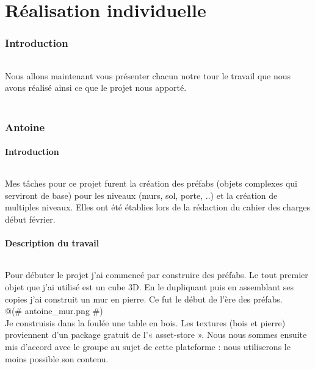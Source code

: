 \documentclass[titlepage, 13px, a4paper]{report}
\begin{document}

\newpage


\part{Réalisation individuelle}
\section*{Introduction}
\paragraph{} \hspace{0pt}
Nous allons maintenant vous présenter chacun notre tour le travail que nous avons réalisé 
ainsi ce que le projet nous apporté. \\ \\

\section{Antoine}
\subsection{Introduction}
\paragraph{} \hspace{0pt} 
Mes tâches pour ce projet furent la création des préfabs (objets complexes qui
serviront de base) pour les niveaux (murs, sol, porte, ..) et la création de multiples
niveaux. Elles ont été établies lors de la rédaction du cahier des charges début février. \\

\subsection{Description du travail}

\paragraph{} \hspace{0pt} 
Pour débuter le projet j'ai commencé par construire des préfabs. Le tout premier
objet que j'ai utilisé est un cube 3D. En le dupliquant puis en assemblant ses
copies j'ai construit un mur en pierre. Ce fut le début de l'ère des préfabs. \\@(\# antoine\_mur.png \#)\@  \\
Je construisis dans la foulée une table en bois. Les textures (bois et pierre)
proviennent d'un package gratuit de l'« asset-store ». Nous nous sommes ensuite
mis d'accord avec le groupe au sujet de cette plateforme : nous utiliserons le
moins possible son contenu. \\
\end{document}
